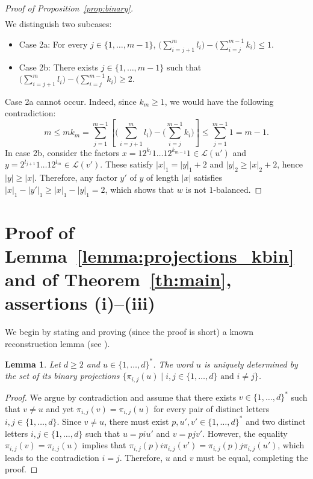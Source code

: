\documentclass{template_arxiv}
\newtheorem{lemma}{Lemma}%
\theoremstyle{definition}
\newcommand{\ds}{\displaystyle}
\newcommand{\lan}{\mathcal{L}}
\begin{document}
\begin{proof}[Proof of Proposition~\ref{prop:binary}]
\[\begin{array}{rcl}
    \end{array}
\]
We distinguish two subcases:
\begin{itemize}
    \vspace{-0.3cm}
    \item[-] Case 2a: For every $j\in\{1,\ldots,m-1\}$, $\ds\Big(\sum\limits_{i=j+1}^m l_i\Big)-\Big(\sum\limits_{i=j}^{m-1} k_i\Big)\leq 1$.
    \vspace{-0.3cm}
    \item[-] Case 2b: There exists $j\in\{1,\ldots,m-1\}$ such that $\ds\Big(\sum\limits_{i=j+1}^m l_i\Big)-\Big(\sum\limits_{i=j}^{m-1} k_i\Big)\geq 2$.
\end{itemize}
\vspace{-0.3cm}
Case 2a cannot occur. Indeed, since $k_m\geq 1$, we would have the following contradiction:
\[
    m\leq mk_m=\sum\limits_{j=1}^{m-1}\left[\Big(\sum\limits_{i=j+1}^m l_i\Big)-\Big(\sum\limits_{i=j}^{m-1} k_i\Big)\right]\leq \sum\limits_{j=1}^{m-1} 1=m-1.
\]
In case 2b, consider the factors $x=12^{k_j}1\ldots 12^{k_{m-1}}1\in\lan(u')$ and $y=2^{l_{j+1}}1\ldots 12^{l_m}\in\lan(v')$. These satisfy $|x|_1=|y|_1+2$ and $|y|_2\geq |x|_2+2$, hence $|y|\geq |x|$. Therefore, any factor $y'$ of $y$ of length $|x|$ satisfies $|x|_1-|y'|_1\geq|x|_1-|y|_1=2$, which shows that $w$ is not $1$-balanced.
\end{proof}


\section{Proof of Lemma~\ref{lemma:projections_kbin} and of Theorem~\ref{th:main}, assertions (i)--(iii)}\label{sec:binary_projections}

We begin by stating and proving (since the proof is short) a known reconstruction lemma (see \cite[Lemma~6.2.19]{Loth97}).

\begin{lemma}\label{lemma:reconstruction}
Let $d\geq 2$ and $u\in\{1,\ldots,d\}^*$. The word $u$ is uniquely determined by the set of its binary projections $\{\pi_{i,j}(u)\;|\;i,j\in\{1,\ldots,d\} \text{ and }i\neq j\}$.
\end{lemma}

\begin{proof}
We argue by contradiction and assume that there exists $v\in\{1,\ldots,d\}^*$ such that $v\neq u$ and yet $\pi_{i,j}(v)=\pi_{i,j}(u)$ for every pair of distinct letters $i,j\in\{1,\ldots,d\}$. Since $v\neq u$, there must exist $p,u',v'\in\{1,\ldots,d\}^*$ and two distinct letters $i,j\in\{1,\ldots,d\}$ such that $u=piu'$ and $v=pjv'$. However, the equality $\pi_{i,j}(v)=\pi_{i,j}(u)$ implies that $\pi_{i,j}(p)i\pi_{i,j}(v')=\pi_{i,j}(p)j\pi_{i,j}(u')$, which leads to the contradiction $i=j$. Therefore, $u$ and $v$ must be equal, completing the proof.
\end{proof}
\end{document}
